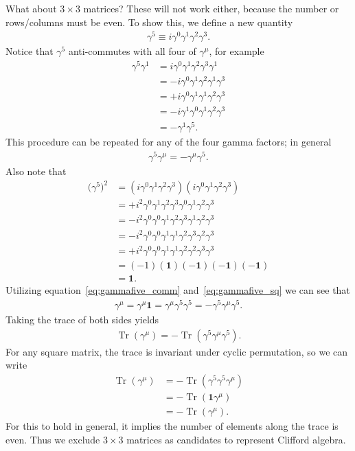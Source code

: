 \documentclass[titlepage,letterpaper,onecolumn,11pt,final]{report}
\newcommand{\gama}{\gamma^{0}}
\newcommand{\gamb}{\gamma^{1}}
\newcommand{\gamc}{\gamma^{2}}
\newcommand{\gamd}{\gamma^{3}}
\newcommand{\gamf}{\gamma^{5}}
\DeclareMathOperator{\Tr}{Tr}
\numberwithin{equation}{section}
\numberwithin{figure}{section}
\begin{document}
What about $3 \times 3$ matrices? These will not work either, because the number or rows/columns must be even. To show this, we define a new quantity
\begin{gather}
	\gamf \equiv i \gama \gamb \gamc \gamd .
\end{gather}
%
Notice that $\gamf$ anti-commutes with all four of $\gamma^{\mu}$, for example
\begin{equation}
	\begin{split}
	\gamf \gamb &= i \gama \gamb \gamc \gamd \gamb \\
	&= - i \gama \gamb \gamc \gamb \gamd \\
	&= + i \gama \gamb \gamb \gamc \gamd \\
	&= - i \gamb \gama \gamb \gamc \gamd \\
	&= - \gamb \gamf.
	\end{split}
\end{equation}
%
This procedure can be repeated for any of the four gamma factors; in general
\begin{gather}
	\label{eq:gammafive_comm}
	\gamf \gamma^{\mu} = - \gamma^{\mu} \gamf .
\end{gather}
%
Also note that
\begin{equation}
	\begin{split}
	\label{eq:gammafive_sq}
	\big( \gamf \big)^{2} &= \left( i \gama \gamb \gamc \gamd \right) \left( i \gama \gamb \gamc \gamd \right) \\
	&= +i^{2} \gama \gamb \gamc \gamd \gama \gamb \gamc \gamd \\
	&= -i^{2} \gama \gama \gamb \gamc \gamd \gamb \gamc \gamd \\
	&= -i^{2} \gama \gama \gamb \gamb \gamc \gamd \gamc \gamd \\
	&= +i^{2} \gama \gama \gamb \gamb \gamc \gamc \gamd \gamd \\
	&= (-1)(\mathbf{1})(-\mathbf{1})(-\mathbf{1})(-\mathbf{1}) \\
	&= \mathbf{1}.
	\end{split}
\end{equation}
%
Utilizing equation~\ref{eq:gammafive_comm} and~\ref{eq:gammafive_sq} we can see that
\begin{gather}
	\gamma^{\mu} = \gamma^{\mu} \mathbf{1} = \gamma^{\mu} \gamf \gamf = - \gamf \gamma^{\mu} \gamf.
\end{gather}
%
Taking the trace of both sides yields
\begin{gather}
	\Tr ( \gamma^{\mu} ) =  - \Tr ( \gamf \gamma^{\mu} \gamf ).
\end{gather}
%
For any square matrix, the trace is invariant under cyclic permutation, so we can write
\begin{equation}
	\begin{split}
	\Tr ( \gamma^{\mu} ) &=  - \Tr ( \gamf \gamf \gamma^{\mu} ) \\
  &= - \Tr ( \mathbf{1} \gamma^{\mu} ) \\
	&= - \Tr ( \gamma^{\mu} ) .
	\end{split}
\end{equation}
For this to hold in general, it implies the number of elements along the trace is even. Thus we exclude $3 \times 3$ matrices as candidates to represent Clifford algebra. 
\end{document}
